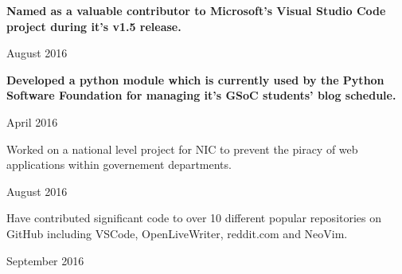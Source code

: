 
\begin{cvachievements}

\cvachievement%
  {%
    \begin{cvachievementitems}
      \item{\textbf{Named as a valuable contributor to Microsoft's Visual Studio
            Code project during it's v1.5 release.}} %
    \end{cvachievementitems}
  }
  {August 2016} %

\cvachievement%
  {%
    \begin{cvachievementitems}
      \item{\textbf{Developed a python module which is currently used by the
            Python Software Foundation for managing it's GSoC students' blog
            schedule.}} %
    \end{cvachievementitems}
  }
  {April 2016} %

\cvachievement%
  {%
    \begin{cvachievementitems}
      \item{Worked on a national level project for NIC to prevent the piracy of
            web applications within governement departments.} %
    \end{cvachievementitems}
  }
  {August 2016} %

\cvachievement%
  {%
    \begin{cvachievementitems}
      \item{Have contributed significant code to over 10 different popular
            repositories on GitHub including VSCode, OpenLiveWriter, reddit.com
            and NeoVim.} %
    \end{cvachievementitems}
  }
  {September 2016} %

\end{cvachievements}

